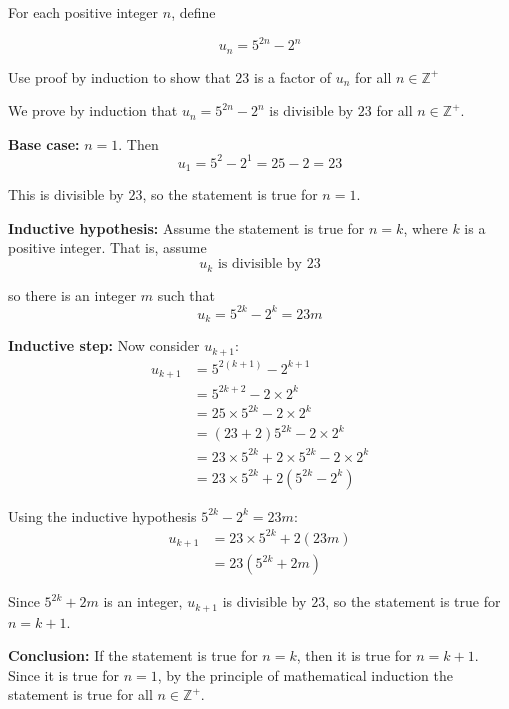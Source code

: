 \documentclass[leqno]{article}
\begin{document}
\begin{enumerate}[
  label=\textbf{\arabic*.},
  leftmargin=*,
  topsep=0pt,
  partopsep=0pt,
  parsep=0pt
]
\newpage

\questionitem

For each positive integer $n$, define

\[u_n=5^{2n}-2^n\]

Use proof by induction to show that $23$ is a factor of $u_n$ for all $n \in \mathbb{Z}^+$ 

\vspace*{10pt}

\begin{djsSolution}
We prove by induction that \(u_n=5^{2n}-2^n\) is divisible by \(23\) for all \(n\in\mathbb{Z}^+\).

\textbf{Base case:} \(n=1\). Then
\[
u_1=5^{2}-2^1=25-2=23
\]

This is divisible by \(23\), so the statement is true for \(n=1\).

\textbf{Inductive hypothesis:} Assume the statement is true for \(n=k\), where \(k\) is a positive integer. That is, assume
\[
u_k \text{ is divisible by } 23
\]

so there is an integer \(m\) such that
\[
u_k=5^{2k}-2^k=23m
\]

\textbf{Inductive step:} Now consider \(u_{k+1}\):
\begin{align*}
u_{k+1}
&=5^{2(k+1)}-2^{k+1}\\
&=5^{2k+2}-2\times 2^k\\
&=25\times 5^{2k}-2\times 2^k\\
&=(23+2)5^{2k}-2\times 2^k\\
&=23\times 5^{2k}+2\times 5^{2k}-2\times 2^k\\
&=23\times 5^{2k}+2\left(5^{2k}-2^k\right)
\end{align*}

Using the inductive hypothesis \(5^{2k}-2^k=23m\):
\begin{align*}
u_{k+1}
&=23\times 5^{2k}+2(23m)\\
&=23\left(5^{2k}+2m\right)
\end{align*}

Since \(5^{2k}+2m\) is an integer, \(u_{k+1}\) is divisible by \(23\), so the statement is true for \(n=k+1\).

\textbf{Conclusion:} If the statement is true for \(n=k\), then it is true for \(n=k+1\). Since it is true for \(n=1\), by the principle of mathematical induction the statement is true for all \(n\in\mathbb{Z}^+\).
\end{djsSolution}



\end{enumerate}
\end{document}
